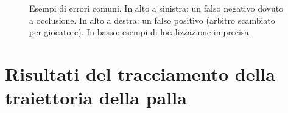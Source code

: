 \documentclass[12pt,a4paper,openright,twoside]{book}
\begin{document}

\begin{figure}[h]
  \centering
  \caption{Esempi di errori comuni. In alto a sinistra: un falso negativo dovuto a occlusione. In alto a destra: un falso positivo (arbitro scambiato per giocatore). In
basso: esempi di localizzazione imprecisa.}
  \label{fig:error_analysis_examples}
\end{figure}

\section{Risultati del tracciamento della traiettoria della palla}
\label{sec:risultati-tracciamento-traiettoria}
\end{document}
